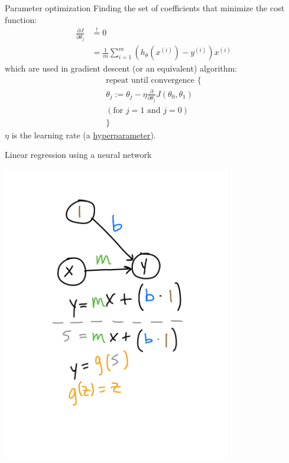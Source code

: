\documentclass[xetex,compress]{beamer}
\begin{document}
\begin{frame}{Parameter optimization}
  Finding the set of coefficients that minimize the cost function:
  \begin{align*}
    \frac{\partial J}{\partial \theta_{j}} &\overset{!}{=} 0 \\
    &= \frac{1}{m} \sum_{i=1}^{m} \left( h_{\theta}(x^{(i)}) - y^{(i)} \right) x^{(i)}
  \end{align*}
  which are used in gradient descent (or an equivalent) algorithm:
  \begin{align*}
    \text{repeat until convergence \{} \\
    \theta_{j} := \theta_{j} - \eta \frac{\partial}{\partial \theta_{j}} J(\theta_{0},\theta_{1}) \\
    (\text{for }j = 1\text{ and }j = 0) \\
    \text{\}}
  \end{align*}
  \(\eta\) is the learning rate (a \underline{hyperparameter}).
\end{frame}

\begin{frame}{Linear regression using a neural network}
  \begin{center}
    \includegraphics[width=0.75\textwidth]{./figures/lr_nn_1.pdf}
  \end{center}
\end{frame}
\end{document}
